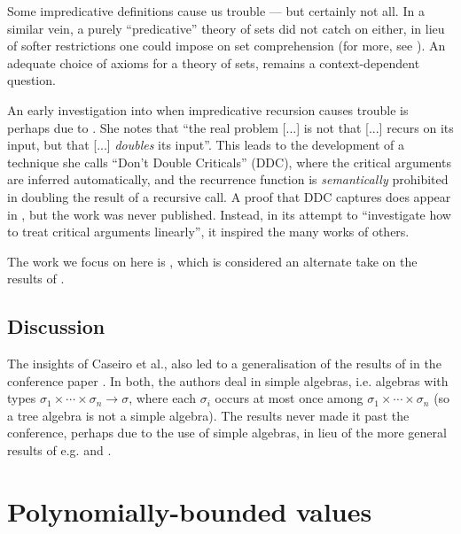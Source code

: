 Some impredicative definitions cause us trouble --- but certainly not all.  In
a similar vein, a purely ``predicative'' theory of sets did not catch on
either, in lieu of softer restrictions one could impose on set comprehension
(for more, see \cite{feferman-1964}). An adequate choice of axioms for a theory
of sets, remains a context-dependent question.


An early investigation into when impredicative recursion causes trouble is
perhaps due to \cite{caseiro-1996}. She notes that ``the real problem [...] is
not that [...] recurs on its input, but that [...] \emph{doubles} its input''.
This leads to the development of a technique she calls ``Don't Double
Criticals'' (DDC), where the critical arguments are inferred automatically, and
the recurrence function is \emph{semantically} prohibited in doubling the
result of a recursive call. A proof that DDC captures \FPTIME{} does appear in
\cite{caseiro-1996}, but the work was never published. Instead, in its attempt
to ``investigate how to treat critical arguments linearly'', it inspired the
many works of others.

The work we focus on here is \cite{aehlig-schwichtenberg-2002}, which is
considered an alternate take on the results of \cite{hofmann-2003}.

\subsection{Discussion}

The insights of Caseiro et al., also led to a generalisation of the results of
\cite{marion-2003} in the conference paper \cite{marion-moyen-2000}. In both,
the authors deal in simple algebras, i.e.  algebras with types $\sigma_1 \times
\cdots \times \sigma_n \rightarrow \sigma$, where each $\sigma_i$ occurs at
most once among $\sigma_1 \times \cdots \times \sigma_n$ (so a tree algebra is
not a simple algebra).  The results never made it past the conference,
perhaps due to the use of simple algebras, in lieu of the more general results
of e.g.  \cite{aehlig-schwichtenberg-2002} and \cite{hofmann-2003}.

\section{Polynomially-bounded values}
